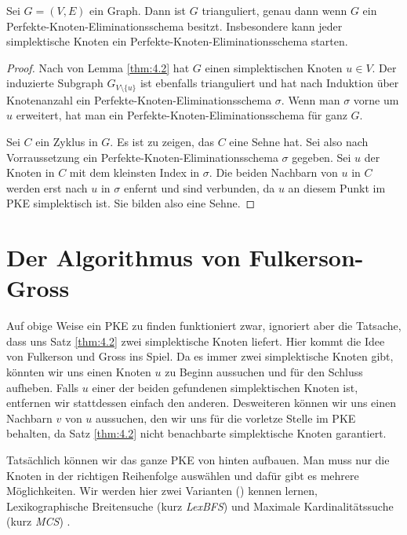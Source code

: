 \documentclass[../main.tex]{subfiles}
\begin{document}
\begin{satz} \label{thm:tri_PKE}
    Sei $G = (V, E)$ ein Graph. Dann ist $G$ trianguliert, genau dann wenn $G$ ein Perfekte-Knoten-Eliminationsschema besitzt. Insbesondere kann jeder simplektische Knoten ein Perfekte-Knoten-Eliminationsschema starten.
\end{satz}
\begin{proof}
    \say{$\Rightarrow$} Nach von Lemma \ref{thm:4.2} hat $G$ einen simplektischen Knoten $u \in V$. Der induzierte Subgraph $G_{V \setminus \{u\}}$ ist ebenfalls trianguliert und hat nach Induktion über Knotenanzahl ein Perfekte-Knoten-Eliminationsschema $\sigma$. Wenn man $\sigma$ vorne um $u$ erweitert, hat man ein Perfekte-Knoten-Eliminationsschema für ganz $G$.
    
    \say{$\Leftarrow$} Sei $C$ ein Zyklus in $G$. Es ist zu zeigen, das $C$ eine Sehne hat. Sei also nach Vorraussetzung ein Perfekte-Knoten-Eliminationsschema $\sigma$ gegeben. Sei $u$ der Knoten in $C$ mit dem kleinsten Index in $\sigma$. Die beiden Nachbarn von $u$ in $C$ werden erst nach $u$ in $\sigma$ enfernt und sind verbunden, da $u$ an diesem Punkt im PKE simplektisch ist. Sie bilden also eine Sehne.
\end{proof}    

\section{Der Algorithmus von Fulkerson-Gross}

Auf obige Weise ein PKE zu finden funktioniert zwar, ignoriert aber die Tatsache, dass uns Satz \ref{thm:4.2} zwei simplektische Knoten liefert. Hier kommt die Idee von Fulkerson und Gross ins Spiel. Da es immer zwei simplektische Knoten gibt, könnten wir uns einen Knoten $u$ zu Beginn aussuchen und für den Schluss aufheben. Falls $u$ einer der beiden gefundenen simplektischen Knoten ist, entfernen wir stattdessen einfach den anderen. Desweiteren können wir uns einen Nachbarn $v$ von $u$ aussuchen, den wir uns für die vorletze Stelle im PKE behalten, da Satz \ref{thm:4.2} nicht benachbarte simplektische Knoten garantiert.

Tatsächlich können wir das ganze PKE von hinten aufbauen. Man muss nur die Knoten in der richtigen Reihenfolge auswählen und dafür gibt es mehrere Möglichkeiten. Wir werden hier zwei Varianten () kennen lernen, Lexikographische Breitensuche (kurz \emph{LexBFS})  und Maximale Kardinalitätssuche (kurz \emph{MCS}) .
\end{document}
